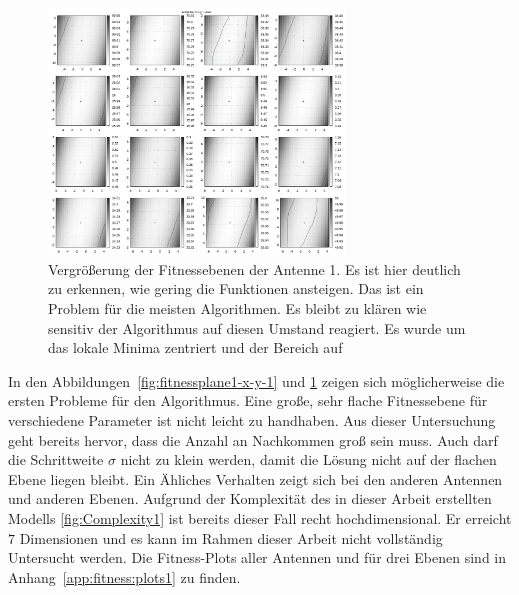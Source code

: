 \begin{figure}[ht!]
  \caption[Fitness Ebenen Heatmap, vergrößert]{Vergrößerung der Fitnessebenen der Antenne 1. Es ist hier deutlich zu erkennen, wie gering die Funktionen ansteigen. Das ist ein Problem für die meisten Algorithmen. Es bleibt zu klären wie sensitiv der Algorithmus auf diesen Umstand reagiert. Es wurde um das lokale Minima zentriert und der Bereich auf}
  \begin{center}
   \includegraphics[width=0.7\textwidth]{img/fitness/xy_a0zoomed.png}
  \end{center}
  \label{fig:fitnessplane1-x-y-zoom-1}
%
\end{figure}
%
In den Abbildungen~\ref{fig:fitnessplane1-x-y-1} und \ref{fig:fitnessplane1-x-y-zoom-1} zeigen sich möglicherweise die ersten Probleme für den Algorithmus. Eine große, sehr flache Fitnessebene für verschiedene Parameter ist nicht leicht zu handhaben. Aus dieser Untersuchung geht bereits hervor, dass die Anzahl an Nachkommen groß sein muss. Auch darf die Schrittweite $\sigma$ nicht zu klein werden, damit die Lösung nicht auf der flachen Ebene liegen bleibt. Ein Ähliches Verhalten zeigt sich bei den anderen Antennen und anderen Ebenen. Aufgrund der Komplexität des in dieser Arbeit erstellten Modells \ref{fig:Complexity1} ist bereits dieser Fall recht hochdimensional. Er erreicht $7$ Dimensionen und es kann im Rahmen dieser Arbeit nicht vollständig Untersucht werden. Die Fitness-Plots aller Antennen und für drei Ebenen sind in Anhang~\ref{app:fitness:plots1} zu finden.
%
